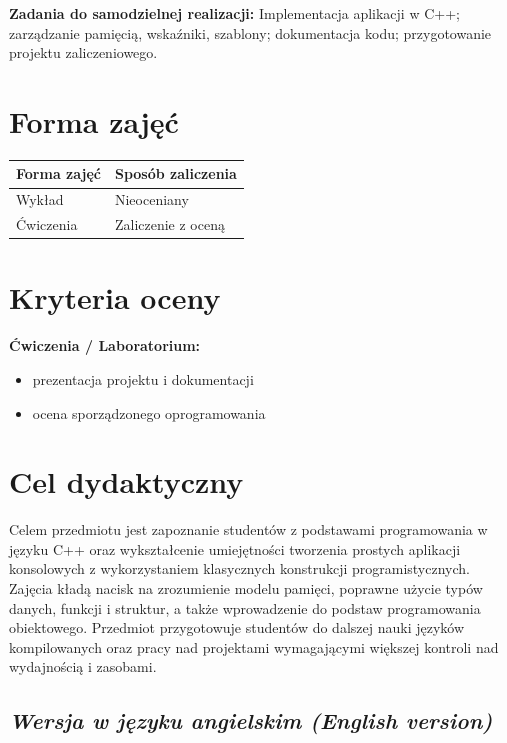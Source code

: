 \documentclass[12pt, a4paper]{article}
\newcommand{\thdrule}{\noalign{\global\setlength{\extrarowheight}{0pt}}}
\newcommand{\thdend}{\noalign{\global\setlength{\extrarowheight}{3pt}}}
\begin{document}
\vspace{4pt}
\noindent\textbf{Zadania do samodzielnej realizacji:} Implementacja aplikacji w C++; zarządzanie pamięcią, wskaźniki, szablony; dokumentacja kodu; przygotowanie projektu zaliczeniowego.

\section{Forma zajęć}

\begin{center}
{\scriptsize
\begin{tabular}{m{5cm}m{8cm}}
\thdrule\toprule
\rowcolor{pjatkRed} {\color{white}\textbf{Forma zajęć}} & {\color{white}\textbf{Sposób zaliczenia}} \\
\midrule\thdend
  \rowcolor{tableRowLight} Wykład & Nieoceniany \\
  \rowcolor{tableRowAlt} Ćwiczenia & Zaliczenie z oceną \\
\bottomrule
\end{tabular}}
\end{center}

\section{Kryteria oceny}

\textbf{Ćwiczenia / Laboratorium:}
\begin{itemize}
  \item prezentacja projektu i dokumentacji
  \item ocena sporządzonego oprogramowania
\end{itemize}


\section{Cel dydaktyczny}

Celem przedmiotu jest zapoznanie studentów z podstawami programowania w języku C++ oraz wykształcenie umiejętności tworzenia prostych aplikacji konsolowych z wykorzystaniem klasycznych konstrukcji programistycznych. Zajęcia kładą nacisk na zrozumienie modelu pamięci, poprawne użycie typów danych, funkcji i struktur, a także wprowadzenie do podstaw programowania obiektowego. Przedmiot przygotowuje studentów do dalszej nauki języków kompilowanych oraz pracy nad projektami wymagającymi większej kontroli nad wydajnością i zasobami.

\subsection*{\textit{Wersja w języku angielskim (English version)}}
\end{document}
